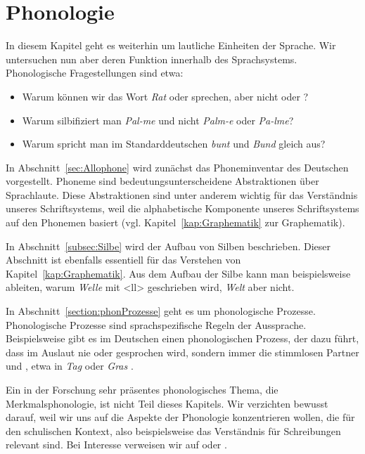 \chapter{Phonologie}
\label{kap:Phonologie}


In diesem Kapitel geht es weiterhin um lautliche Einheiten der Sprache. Wir untersuchen nun aber deren Funktion innerhalb des Sprachsystems. Phonologische Fragestellungen sind etwa:

\begin{itemize}
\item Warum können wir das Wort \textit{Rat} \textipa{[ra:t]} oder \textipa{[Ka:t]} sprechen, aber nicht \textipa{[ta:t]} oder \textipa{[za:t]}?
\item Warum silbifiziert man \textit{Pal-me} und nicht \textit{Palm-e} oder \textit{Pa-lme}?
\item Warum spricht man im Standarddeutschen \textit{bunt} und \textit{Bund} gleich aus?
\end{itemize}

In Abschnitt~\ref{sec:Allophone} wird zunächst das Phoneminventar des Deutschen vorgestellt. Phoneme sind bedeutungsunterscheidene Ab\-straktionen über Sprachlaute. Diese Ab\-straktionen sind unter anderem wichtig für das Verständnis unseres Schriftsystems, weil die alphabetische Komponente unseres Schriftsystems auf den Phonemen basiert (vgl. Kapitel~\ref{kap:Graphematik} zur Graphematik).



In Abschnitt~\ref{subsec:Silbe} wird der Aufbau von Silben beschrieben. Dieser Abschnitt ist ebenfalls essentiell für das Verstehen von Kapitel~\ref{kap:Graphematik}. Aus dem Aufbau der Silbe kann man beispielsweise ableiten, warum \textit{Welle} mit <ll> geschrieben wird, \textit{Welt} aber nicht.

In Abschnitt~\ref{section:phonProzesse} geht es um phonologische Prozesse. Phonologische Prozesse sind sprachspezifische Regeln der Aussprache. Beispielsweise gibt es im Deutschen einen phonologischen Prozess, der dazu führt, dass im Auslaut nie \textipa{[b, d, g, v]} oder \textipa{[z]} gesprochen wird, sondern immer die stimmlosen Partner \textipa{[p, t, k, f]} und \textipa{[s]}, etwa in \textit{Tag} \textipa{[ta:k]} oder \textit{Gras} \textipa{[gKa:s]}. 

Ein in der Forschung sehr präsentes phonologisches Thema, die Merkmalsphonologie, ist nicht Teil dieses Kapitels. Wir verzichten bewusst darauf, weil wir uns auf die Aspekte der Phonologie konzentrieren wollen, die für den schulischen Kontext, also beispielsweise das Verständnis für Schreibungen relevant sind. Bei Interesse verweisen wir auf \citet[Kap.4]{Hall2000} oder \citet[19--26]{Wiese2000}.

